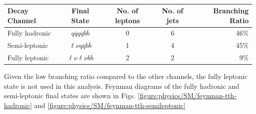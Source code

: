 
\begin{table}[h]
\centering
	\begin{tabular}{ l c c c r }
	\hline \hline
	Decay Channel & Final State & No. of leptons & No. of jets & Branching Ratio \\ \hline
	Fully hadronic & $q\overline{q}q\overline{q}b\overline{b}$ & 0 & 6 & 46\% \\
	Semi-leptonic &  $\ell \nu q\overline{q}b\overline{b}$ & 1 & 4 & 45\% \\
	Fully leptonic & $\ell \nu \ell \nu b\overline{b}$ & 2 & 2 & 9\% \\ \hline \hline
	\end{tabular}
	\caption{ }
	\label{table:physics/final-states}
\end{table}

Given the low branching ratio compared to the other channels, the fully leptonic state is not used in this analysis. Feynman diagrams of the fully hadronic and semi-leptonic final states are shown in Figs. \ref{figure:physics/SM/feynman-tth-hadronic} and \ref{figure:physics/SM/feynman-tth-semileptonic}

